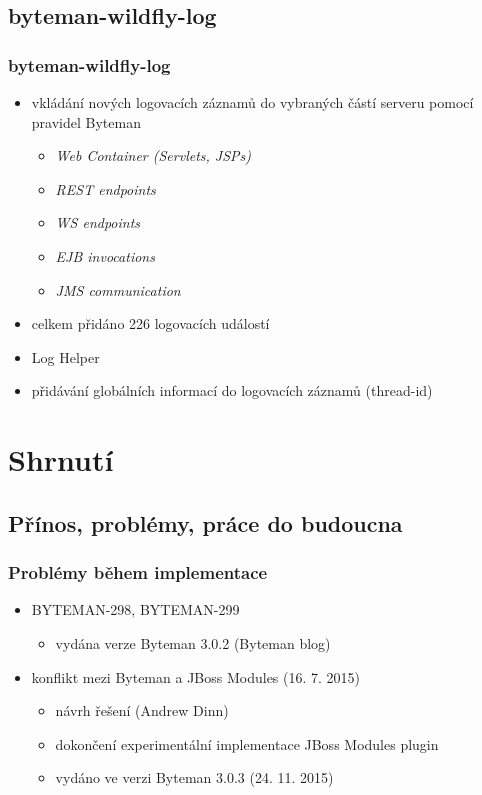\documentclass{beamer}
\begin{document}
\subsection{byteman-wildfly-log}
\begin{frame}[fragile] %
\frametitle{byteman-wildfly-log}
\begin{itemize}
	\item vkládání nových logovacích záznamů do vybraných částí serveru pomocí pravidel Byteman
	\begin{itemize}
		\item \textit{Web Container (Servlets, JSPs)}
		\item \textit{REST endpoints}
		\item \textit{WS endpoints}
		\item \textit{EJB invocations}
		\item \textit{JMS communication}
	\end{itemize}
	\item celkem přidáno 226 logovacích událostí
	\item Log Helper
	\item přidávání globálních informací do logovacích záznamů (thread-id)
\end{itemize}
\end{frame}


\section{Shrnutí}
\subsection{Přínos, problémy, práce do budoucna}
\begin{frame}
	\frametitle{Problémy během implementace}
	\begin{itemize}
		\item BYTEMAN-298, BYTEMAN-299
		\begin{itemize}
			\item vydána verze Byteman 3.0.2 (Byteman blog)
		\end{itemize}
		\item konflikt mezi Byteman a JBoss Modules (16. 7. 2015)
		\begin{itemize}
			\item návrh řešení (Andrew Dinn)
			\item dokončení experimentální implementace JBoss Modules plugin
			\item vydáno ve verzi Byteman 3.0.3 (24. 11. 2015)
		\end{itemize}
	\end{itemize}
\end{frame}
\end{document}
